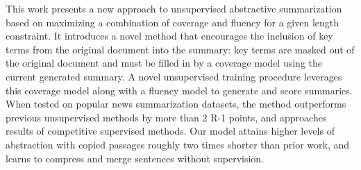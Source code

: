 This work presents a new approach to unsupervised abstractive summarization based on maximizing a combination of coverage and fluency for a given length constraint. It introduces a novel method that encourages the inclusion of key terms from the original document into the summary: key terms are masked out of the original document and must be filled in by a coverage model using the current generated summary. A novel unsupervised training procedure leverages this coverage model along with a fluency model to generate and score summaries. When tested on popular news summarization datasets, the method outperforms previous unsupervised methods by more than 2 R-1 points, and approaches results of competitive supervised methods. Our model attains higher levels of abstraction with copied passages roughly two times shorter than prior work, and learns to compress and merge sentences without supervision.
